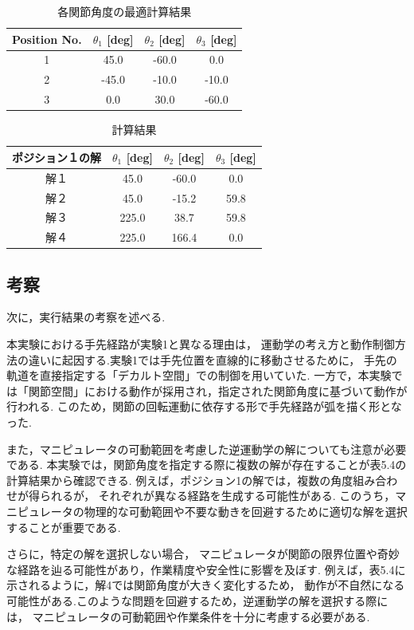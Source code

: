 \begin{table}[h]
  \centering
  \caption{各関節角度の最適計算結果}
  \begin{tabular}{|c|c|c|c|}
    \hline
    Position No. & $\theta_1$ [deg] & $\theta_2$ [deg] & $\theta_3$ [deg] \\ \hline
    \hline
    1            & 45.0             & -60.0            & 0.0              \\ \hline
    2            & -45.0            & -10.0            & -10.0            \\ \hline
    3            & 0.0              & 30.0             & -60.0            \\ \hline
  \end{tabular}
\end{table}

\begin{table}[h]
  \centering
  \caption{計算結果}
  \begin{tabular}{|c|c|c|c|}
    \hline
    ポジション１の解 & $\theta_1$ [deg] & $\theta_2$ [deg] & $\theta_3$ [deg] \\ \hline
    \hline
    解１             & 45.0             & -60.0            & 0.0              \\ \hline
    解２             & 45.0             & -15.2            & 59.8             \\ \hline
    解３             & 225.0            & 38.7             & 59.8             \\ \hline
    解４             & 225.0            & 166.4            & 0.0              \\ \hline
  \end{tabular}
\end{table}

\subsection{考察}
次に，実行結果の考察を述べる.

本実験における手先経路が実験1と異なる理由は，
運動学の考え方と動作制御方法の違いに起因する.実験1では手先位置を直線的に移動させるために，
手先の軌道を直接指定する「デカルト空間」での制御を用いていた.
一方で，本実験では「関節空間」における動作が採用され，指定された関節角度に基づいて動作が行われる.
このため，関節の回転運動に依存する形で手先経路が弧を描く形となった.

また，マニピュレータの可動範囲を考慮した逆運動学の解についても注意が必要である.
本実験では，関節角度を指定する際に複数の解が存在することが表5.4の計算結果から確認できる.
例えば，ポジション1の解では，複数の角度組み合わせが得られるが，
それぞれが異なる経路を生成する可能性がある.
このうち，マニピュレータの物理的な可動範囲や不要な動きを回避するために適切な解を選択することが重要である.

さらに，特定の解を選択しない場合，
マニピュレータが関節の限界位置や奇妙な経路を辿る可能性があり，作業精度や安全性に影響を及ぼす.
例えば，表5.4に示されるように，解4では関節角度が大きく変化するため，
動作が不自然になる可能性がある.このような問題を回避するため，逆運動学の解を選択する際には，
マニピュレータの可動範囲や作業条件を十分に考慮する必要がある.

